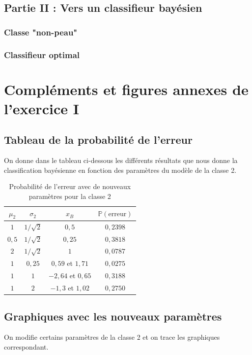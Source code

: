 \documentclass[11pt,a4paper]{article}
\begin{document}
\subsection{Partie II : Vers un classifieur bayésien}
\subsubsection{Classe "non-peau"}


\subsubsection{Classifieur optimal}

\newpage
\appendix
\section{Compléments et figures annexes de l'exercice I}
\subsection{Tableau de la probabilité de l'erreur}

On donne dans le tableau ci-dessous les différents résultats que nous donne la classification bayésienne en fonction des paramètres du modèle de la classe 2.
\begin{table}[H]
\center
\begin{tabular}{|c|c|c|c|}
\hline 
$\mu_2$ & $\sigma_2$ & $x_B$ & $\mathbb{P}(\text{erreur})$ \\ 
\hline 
$1$ & $1/ \sqrt{2}$ & $0,5$ & $0,2398$ \\ 
\hline 
$0,5$ & $1/ \sqrt{2}$ & $0,25$ & $0,3818$ \\ 
\hline 
$2$ & $1/ \sqrt{2}$ & $1$ & $0,0787$ \\ 
\hline 
$1$ & $0,25$ & $0,59$ et $1,71$ & $0,0275$ \\ 
\hline 
$1$ & $1$ & $-2,64$ et $0,65$ & $0,3188$ \\ 
\hline 
$1$ & $2$ & $-1,3$ et $1,02$ & $0,2750$ \\ 
\hline 
\end{tabular}
\caption{Probabilité de l'erreur avec de nouveaux paramètres pour la classe 2}

\end{table}


\subsection{Graphiques avec les nouveaux paramètres}
On modifie certains paramètres de la classe 2 et on trace les graphiques correspondant.
\end{document}
